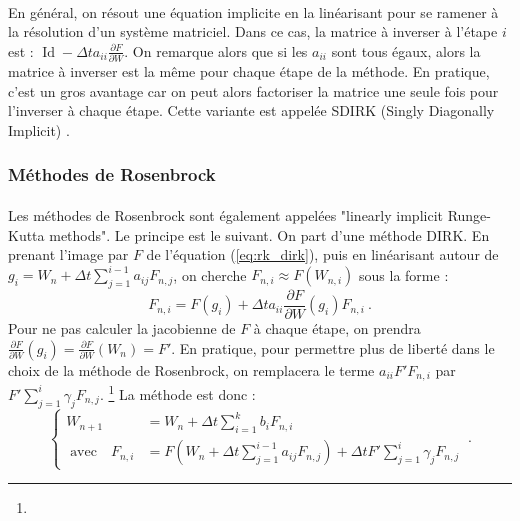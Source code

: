       \paragraph{}
      En général, on résout une équation implicite en la linéarisant pour se ramener à la résolution d'un système matriciel.
      Dans ce cas, la matrice à inverser à l'étape $i$ est : $\operatorname{Id} - \Delta ta_{ii}\frac{\partial F}{\partial W}$.
      On remarque alors que si les $a_{ii}$ sont tous égaux, alors la matrice à inverser est la même pour chaque étape de la méthode.
      En pratique, c'est un gros avantage car on peut alors factoriser la matrice une seule fois pour l'inverser à chaque étape.
      Cette variante est appelée SDIRK (Singly Diagonally Implicit) \cite{HairerWanner1996}.


    \subsubsection{Méthodes de Rosenbrock}

      \paragraph{}
      Les méthodes de Rosenbrock sont également appelées "linearly implicit Runge-Kutta methods".
      Le principe est le suivant.
      On part d'une méthode DIRK.
      En prenant l'image par $F$ de l'équation (\ref{eq:rk_dirk}), puis en linéarisant autour de $g_i = W_n + \Delta t\sum_{j = 1}^{i-1}a_{ij}F_{n,j}$, on cherche $F_{n,i} \approx F\left(W_{n,i}\right)$ sous la forme :
      \[F_{n,i} = F\left(g_i\right) + \Delta ta_{ii}\frac{\partial F}{\partial W}\left(g_i\right)F_{n,i}\ .\]
      Pour ne pas calculer la jacobienne de $F$ à chaque étape, on prendra $\frac{\partial F}{\partial W}\left(g_i\right) = \frac{\partial F}{\partial W}\left(W_n\right) = F'$.
      En pratique, pour permettre plus de liberté dans le choix de la méthode de Rosenbrock, on remplacera le terme $a_{ii}F'F_{n,i}$ par $F'\sum_{j=1}^i\gamma_jF_{n,j}$.
      \footnote{}
      La méthode est donc :
      \begin{equation}\label{eq:rk_rosenbrock}
        \left\{\begin{aligned}
          W_{n+1} &= W_n + \Delta t\sum_{i = 1}^kb_iF_{n,i} \\
          \;\textrm{avec}\quad F_{n,i} &= F\left(W_n + \Delta t\sum_{j = 1}^{i-1}a_{ij}F_{n,j}\right) + \Delta tF'\sum_{j=1}^i\gamma_jF_{n,j}
        \end{aligned}\right.\ .
      \end{equation}

